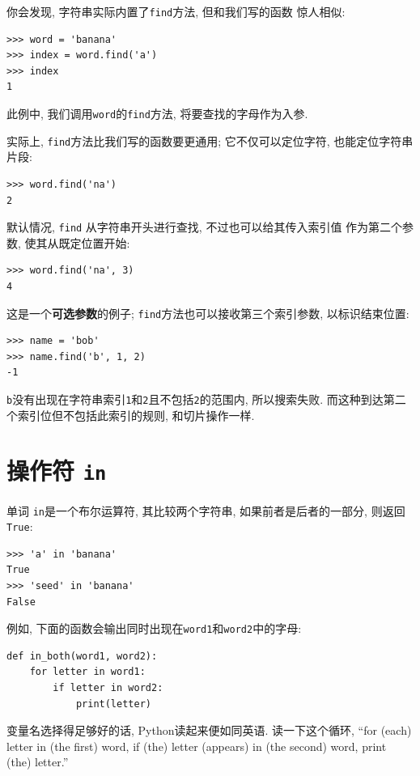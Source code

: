\documentclass[10pt]{book}
\begin{document}
你会发现, 字符串实际内置了{\tt find}方法, 但和我们写的函数
惊人相似:

\begin{verbatim}
>>> word = 'banana'
>>> index = word.find('a')
>>> index
1
\end{verbatim}
%
此例中, 我们调用{\tt word}的{\tt find}方法, 将要查找的字母作为入参. 

实际上, {\tt find}方法比我们写的函数要更通用;
它不仅可以定位字符, 也能定位字符串片段:

\begin{verbatim}
>>> word.find('na')
2
\end{verbatim}
%
默认情况, {\tt find} 从字符串开头进行查找, 不过也可以给其传入索引值
作为第二个参数, 
使其从既定位置开始:

\begin{verbatim}
>>> word.find('na', 3)
4
\end{verbatim}
%
这是一个{\bf 可选参数}的例子;
{\tt find}方法也可以接收第三个索引参数, 以标识结束位置:

\begin{verbatim}
>>> name = 'bob'
>>> name.find('b', 1, 2)
-1
\end{verbatim}
%
{\tt b}没有出现在字符串索引{\tt 1}和{\tt 2}且不包括{\tt 2}的范围内, 
所以搜索失败. 
而这种到达第二个索引位但不包括此索引的规则, 和切片操作一样. 


\section{操作符 {\tt in}}
\label{inboth}

单词 {\tt in}是一个布尔运算符, 其比较两个字符串, 
如果前者是后者的一部分, 
则返回{\tt True}:

\begin{verbatim}
>>> 'a' in 'banana'
True
>>> 'seed' in 'banana'
False
\end{verbatim}
%
例如, 下面的函数会输出同时出现在{\tt word1}和{\tt word2}中的字母:

\begin{verbatim}
def in_both(word1, word2):
    for letter in word1:
        if letter in word2:
            print(letter)
\end{verbatim}
%

变量名选择得足够好的话, Python读起来便如同英语. 
读一下这个循环, ``for (each) letter in (the first) word, if (the) letter 
(appears) in (the second) word, print (the) letter.''
\end{document}
